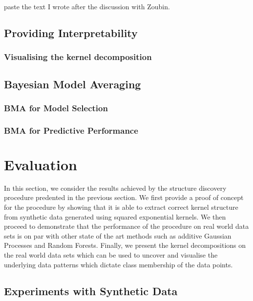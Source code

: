 \documentclass[a4paper,12pt ]{report}
\begin{document}
paste the text I wrote after the discussion with Zoubin. 

\section{Providing Interpretability}

\subsection{Visualising the kernel decomposition}

\section{Bayesian Model Averaging}

\subsection{BMA for Model Selection}

\subsection{BMA for Predictive Performance}



\clearpage



\chapter{Evaluation} 

In this section, we consider the results achieved by the structure discovery procedure predented in the previous section. We first provide a proof of concept for the procedure by showing that it is able to extract correct kernel structure from synthetic data generated using squared
exponential kernels. We then proceed to demonstrate that the performance of the procedure on real world data sets is on par with other state of the art methods such as additive Gaussian Processes and Random Forests. Finally, we present the kernel decompositions on the real
world data sets which can be used to uncover and visualise the underlying data patterns which dictate class membership of the data points. 

\section{Experiments with Synthetic Data}
\end{document}
